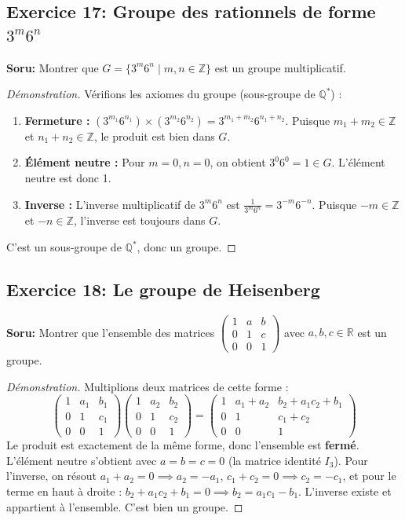 \documentclass[12pt,a4paper]{report}
\begin{document}
\subsection*{Exercice 17: Groupe des rationnels de forme $3^m 6^n$}
\textbf{Soru:} Montrer que $G = \{3^m 6^n \mid m,n \in \mathbb{Z}\}$ est un groupe multiplicatif.
\begin{proof}[Démonstration]
Vérifions les axiomes du groupe (sous-groupe de $\mathbb{Q}^*$) :
\begin{enumerate}
    \item \textbf{Fermeture :} $(3^{m_1} 6^{n_1}) \times (3^{m_2} 6^{n_2}) = 3^{m_1+m_2} 6^{n_1+n_2}$. Puisque $m_1+m_2 \in \mathbb{Z}$ et $n_1+n_2 \in \mathbb{Z}$, le produit est bien dans $G$.
    \item \textbf{Élément neutre :} Pour $m=0, n=0$, on obtient $3^0 6^0 = 1 \in G$. L'élément neutre est donc 1.
    \item \textbf{Inverse :} L'inverse multiplicatif de $3^m 6^n$ est $\frac{1}{3^m 6^n} = 3^{-m} 6^{-n}$. Puisque $-m \in \mathbb{Z}$ et $-n \in \mathbb{Z}$, l'inverse est toujours dans $G$.
\end{enumerate}
C'est un sous-groupe de $\mathbb{Q}^*$, donc un groupe.
\end{proof}

\subsection*{Exercice 18: Le groupe de Heisenberg}
\textbf{Soru:} Montrer que l'ensemble des matrices $\begin{pmatrix} 1 & a & b \\ 0 & 1 & c \\ 0 & 0 & 1 \end{pmatrix}$ avec $a,b,c \in \mathbb{R}$ est un groupe.
\begin{proof}[Démonstration]
Multiplions deux matrices de cette forme :
\[ \begin{pmatrix} 1 & a_1 & b_1 \\ 0 & 1 & c_1 \\ 0 & 0 & 1 \end{pmatrix} \begin{pmatrix} 1 & a_2 & b_2 \\ 0 & 1 & c_2 \\ 0 & 0 & 1 \end{pmatrix} = \begin{pmatrix} 1 & a_1+a_2 & b_2 + a_1 c_2 + b_1 \\ 0 & 1 & c_1+c_2 \\ 0 & 0 & 1 \end{pmatrix} \]
Le produit est exactement de la même forme, donc l'ensemble est \textbf{fermé}.
L'élément neutre s'obtient avec $a=b=c=0$ (la matrice identité $I_3$).
Pour l'inverse, on résout $a_1+a_2 = 0 \implies a_2 = -a_1$, $c_1+c_2 = 0 \implies c_2 = -c_1$, et pour le terme en haut à droite : $b_2 + a_1 c_2 + b_1 = 0 \implies b_2 = a_1 c_1 - b_1$. L'inverse existe et appartient à l'ensemble. C'est bien un groupe.
\end{proof}
\end{document}
